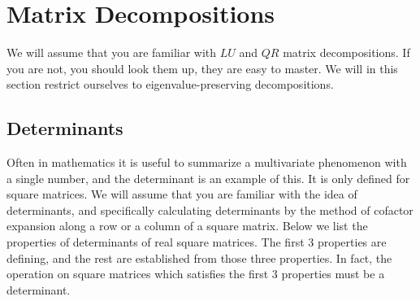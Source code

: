 \documentclass[12pt,oneside]{article}
\begin{document}
\clearpage
\newpage


\section{Matrix Decompositions}
We will assume that you are familiar with $LU$ and $QR$ matrix
decompositions. If you are not, you should look them up, they are easy
to master. We will in this section restrict ourselves to
eigenvalue-preserving decompositions.
\subsection{Determinants}
Often in mathematics it is useful to summarize a multivariate phenomenon with a single number, and the determinant is an example of this. It is only defined for square matrices. We will assume that you are familiar with the idea of determinants,
and specifically calculating determinants by the method of cofactor expansion along a row or a column of a square matrix. Below we list the properties of determinants of real square matrices. The first 3 properties are defining, and the rest are established from those three properties. In fact, the operation on square matrices which satisfies the first 3 properties must be a determinant.
\end{document}
